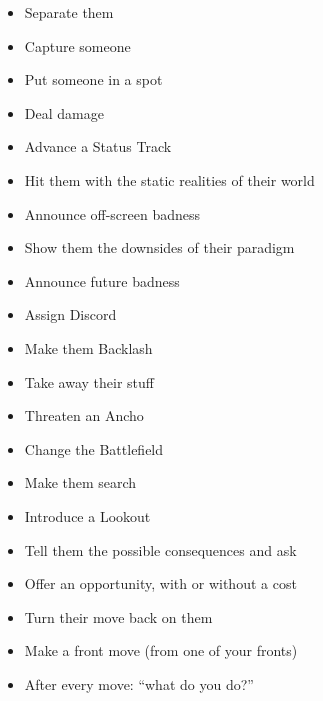 \documentclass[letterpaper,10pt]{article}
\newcommand{\SECTION}[1]{\vspace{.5em}{\noindent\titlefont\large\textbf{#1}}

}
\begin{document}
\SECTION{Your Moves}
\begin{itemize}
\item Separate them
\item Capture someone
\item Put someone in a spot
\item Deal damage
\item Advance a Status Track
\item Hit them with the static realities of their world
\item Announce off-screen badness
\item Show them the downsides of their paradigm
\item Announce future badness
\item Assign Discord
\item Make them Backlash
\item Take away their stuff
\item Threaten an Ancho
\item Change the Battlefield
\item Make them search
\item Introduce a Lookout
\item Tell them the possible consequences and ask
\item Offer an opportunity, with or without a cost
\item Turn their move back on them
\item Make a front move (from one of your fronts)
\item After every move: ``what do you do?''
\end{itemize}
\end{document}
